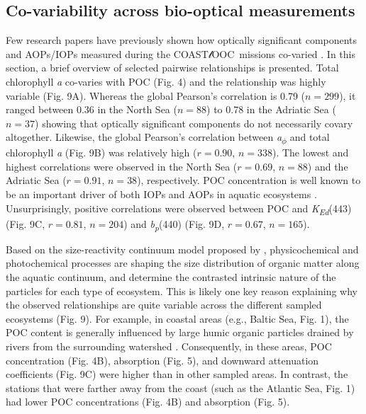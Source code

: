 \documentclass[essd, manuscript]{copernicus}
\newcommand{\coastlooc}{COAST$\mathscr{l}$OOC~\allowbreak}
\begin{document}
\subsection{Co-variability across bio-optical measurements}

Few research papers have previously shown how optically significant components and AOPs/IOPs measured during the \coastlooc missions co-varied \citep{Ferrari2000, Ferrari2003, Babin2003b, Babin2003a}. In this section, a brief overview of selected pairwise relationships is presented. Total chlorophyll \textit{a} co-varies with POC (Fig. 4) and the relationship was highly variable (Fig. 9A). Whereas the global Pearson's correlation is 0.79 ($n = 299$), it ranged between 0.36 in the North Sea ($n = 88$) to 0.78 in the Adriatic Sea ($n = 37$) showing that optically significant components do not necessarily covary altogether. Likewise, the global Pearson's correlation between \textit{a\textsubscript{$\phi$}} and total chlorophyll \textit{a} (Fig. 9B) was relatively high ($r = 0.90$, $n = 338$). The lowest and highest correlations were observed in the North Sea ($r = 0.69$, $n = 88$) and the Adriatic Sea ($r = 0.91$, $n = 38$), respectively. POC concentration is well known to be an important driver of both IOPs and AOPs in aquatic ecosystems \citep{Stramski2008, Cetinic2012a}. Unsurprisingly, positive correlations were observed between POC and \textit{K\textsubscript{Ed}}(443) (Fig. 9C, $r = 0.81$, $n = 204$) and \textit{b\textsubscript{p}}(440) (Fig. 9D, $r = 0.67$, $n = 165$).

Based on the size-reactivity continuum model proposed by \citealt{Benner2015}, physicochemical and photochemical processes are shaping the size distribution of organic matter along the aquatic continuum, and determine the contrasted intrinsic nature of the particles for each type of ecosystem. This is likely one key reason explaining why the observed relationships are quite variable across the different sampled ecosystems (Fig. 9). For example, in coastal areas (e.g., Baltic Sea, Fig. 1), the POC content is generally influenced by large humic organic particles drained by rivers from the surrounding watershed \citep{Babin2003a}. Consequently, in these areas, POC concentration (Fig. 4B), absorption (Fig. 5), and downward attenuation coefficients (Fig. 9C) were higher than in other sampled areas. In contrast, the stations that were farther away from the coast (such as the Atlantic Sea, Fig. 1) had lower POC concentrations (Fig. 4B) and absorption (Fig. 5).
\end{document}
